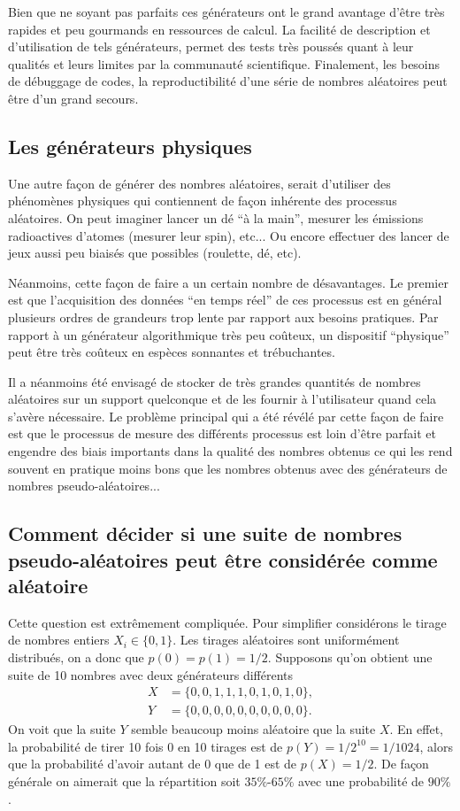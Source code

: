 \documentclass[a4paper,12pt]{book}
\begin{document}
Bien que ne soyant pas parfaits ces générateurs ont le grand avantage d'être très rapides et peu
gourmands en ressources de calcul. La facilité de description et d'utilisation
de tels  générateurs, permet des tests très poussés quant à leur qualités et leurs limites
par la communauté scientifique. Finalement, les besoins de débuggage de codes,
la reproductibilité d'une série de nombres aléatoires
peut être d'un grand secours. 

\subsection{Les générateurs physiques}

Une autre façon de générer des nombres aléatoires, serait d'utiliser des phénomènes physiques
qui contiennent de façon inhérente des processus aléatoires. On peut imaginer 
lancer un dé ``à la main'', mesurer les émissions radioactives d'atomes (mesurer leur spin), 
etc... Ou encore effectuer des lancer de jeux aussi peu biaisés que possibles (roulette, dé, etc).

Néanmoins, cette façon de faire a un certain nombre de désavantages. Le premier
est que l'acquisition des données ``en temps réel'' de ces processus est en général plusieurs
ordres de grandeurs trop lente par rapport aux besoins pratiques. Par rapport à un générateur algorithmique
très peu coûteux, un dispositif ``physique'' peut être très coûteux en espèces sonnantes et trébuchantes.

Il a néanmoins été envisagé de stocker de très grandes quantités de nombres aléatoires
sur un support quelconque et de les fournir à l'utilisateur quand cela s'avère nécessaire.
Le problème principal qui a été révélé par cette façon de faire est que le processus de mesure
des différents processus est loin d'être parfait et engendre des biais importants 
dans la qualité des nombres obtenus ce qui les rend souvent en pratique moins bons que 
les nombres obtenus avec des générateurs de nombres pseudo-aléatoires...

\subsection{Comment décider si une suite de nombres pseudo-aléatoires peut 
être considérée comme aléatoire}

Cette question est extrêmement compliquée. Pour simplifier considérons le tirage de nombres 
entiers $X_i\in \{0,1\}$. Les tirages aléatoires sont uniformément distribués,
on a donc que $p(0)=p(1)=1/2$. Supposons qu'on obtient une suite de 10 nombres 
avec deux générateurs différents
\begin{align}
 X&=\{0,0,1,1,1,0,1,0,1,0\},\\
 Y&=\{0,0,0,0,0,0,0,0,0,0\}.
\end{align}
On voit que la suite $Y$ semble beaucoup moins aléatoire que la suite $X$. 
En effet, la probabilité de tirer 10 fois 0 en 10 tirages est de $p(Y)=1/2^{10}=1/1024$,
alors que la probabilité d'avoir autant de 0 que de 1 est de $p(X)=1/2$.
De façon générale on aimerait que la répartition soit $35\%$-$65\%$ avec une probabilité
de $90\%$.
\end{document}
